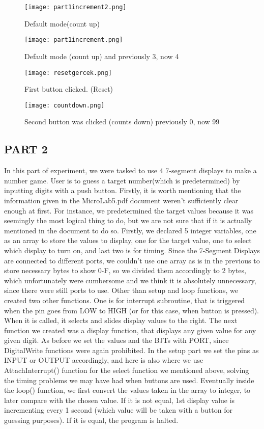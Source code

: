 \documentclass[pdftex,12pt,a4paper]{article}
\begin{document}
\begin{figure}[H]
	\centering
	\texttt{[image: part1increment2.png]}	
	\caption{Default mode(count up)}
	\label{fig4}
\end{figure}
\begin{figure}[H]
	\centering
	\texttt{[image: part1increment.png]}	
	\caption{Default mode (count up) and previously 3, now 4}
	\label{fig4}
\end{figure}
\begin{figure}[H]
	\centering
	\texttt{[image: resetgercek.png]}	
	\caption{First button clicked. (Reset)}
	\label{fig4}
\end{figure}
\begin{figure}[H]
	\centering
	\texttt{[image: countdown.png]}	
	\caption{Second button was clicked (counts down) previously 0, now 99}
	\label{fig4}
\end{figure}

\subsection{PART 2}
In this part of experiment, we were tasked to use 4 7-segment displays to make a number game. User is to guess a target number(which is predetermined) by inputting digits with a push button. Firstly, it is worth mentioning that the information given in the MicroLab5.pdf document weren't sufficiently clear enough at first. For instance, we predetermined the target values because it was seemingly the most logical thing to do, but we are not sure that if it is actually mentioned in the document to do so. Firstly, we declared  5 integer variables, one as an array to store the values to display, one for the target value, one to select which display to turn on, and last two is for timing. Since the 7-Segment Displays are connected to different ports, we couldn't use one array as is in the previous to store necessary bytes to show 0-F, so we divided them accordingly to 2 bytes, which unfortunately were cumbersome and we think it is absolutely unnecessary, since there were still ports to use. Other than setup and loop functions, we created two other functions. One is for interrupt subroutine, that is triggered when the pin goes from LOW to HIGH (or for this case, when button is pressed). When it is called, it selects and slides display values to the right. The next function we created was a display function, that displays any given value for any given digit. As before we set the values and the BJTs with PORT, since DigitalWrite functions were again prohibited. In the setup part we set the pins as INPUT or OUTPUT accordingly, and here is also where we use AttachInterrupt() function for the select function we mentioned above, solving the timing problems we may have had when buttons are used. Eventually inside the loop() function, we first convert the values taken in the array to integer, to later compare with the chosen value. If it is not equal, 1st display value is incrementing every 1 second (which value will be taken with a button for guessing purposes). If it is equal, the program is halted.
\end{document}
